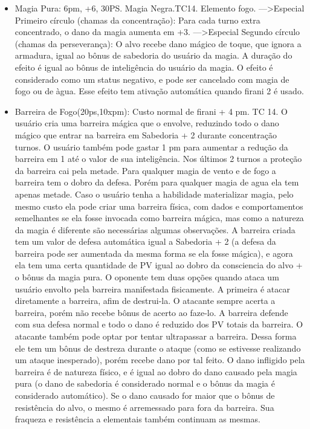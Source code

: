 \begin{itemize}
	\item Magia Pura: 6pm, +6, 30PS. Magia Negra.TC14. Elemento fogo.\newline
--->Especial Primeiro círculo (chamas da concentração): Para cada turno extra concentrado, o dano da magia aumenta em +3.
\newline
--->Especial Segundo círculo (chamas da perseverança): O alvo recebe dano mágico de toque, que ignora a armadura, igual ao bônus de sabedoria do usuário da magia. A duração do efeito é igual ao bônus de inteligência do usuário da magia. O efeito é considerado como um status negativo, e pode ser cancelado com magia de fogo ou de àgua. Esse efeito tem ativação automática quando firani 2 é usado.

	\item Barreira de Fogo(20ps,10xpm): Custo normal de firani + 4 pm. TC 14.\newline
O usuário cria uma barreira mágica que o envolve, reduzindo todo o dano mágico que entrar na barreira em Sabedoria + 2 durante concentração turnos. O usuário também pode gastar 1 pm para aumentar a redução da barreira em 1 até o valor de sua inteligência. Nos últimos 2 turnos a proteção da barreira cai pela metade. Para qualquer magia de vento e de fogo a barreira tem o dobro da defesa. Porém para qualquer magia de agua ela tem apenas metade. Caso o usuário tenha a habilidade materializar magia, pelo mesmo custo ela pode criar uma barreira física, com dados e comportamentos semelhantes se ela fosse invocada como barreira mágica, mas como a natureza da magia é diferente são necessárias algumas observações. A barreira criada tem um valor de defesa automática igual a Sabedoria + 2 (a defesa da barreira pode ser aumentada da mesma forma se ela fosse mágica), e agora ela tem uma certa quantidade de PV igual ao dobro da consciencia do alvo + o bônus da magia pura. O oponente tem duas opções quando ataca um usuário envolto pela barreira manifestada fisicamente. A primeira é atacar diretamente a barreira, afim de destrui-la. O atacante sempre acerta a barreira, porém não recebe bônus de acerto ao faze-lo. A barreira defende com sua defesa normal e todo o dano é reduzido dos PV totais da barreira. O atacante também pode optar por tentar ultrapassar a barreira. Dessa forma ele tem um bônus de destreza durante o ataque (como se estivesse realizando um ataque inesperado), porém recebe dano por tal feito. O dano infligido pela barreira é de natureza físico, e é igual ao dobro do dano causado pela magia pura (o dano de sabedoria é considerado normal e o bônus da magia é considerado automático). Se o dano causado for maior que o bônus de resistência do alvo, o mesmo é arremessado para fora da barreira. Sua fraqueza e resistência a elementais também continuam as mesmas. 


\end{itemize}
